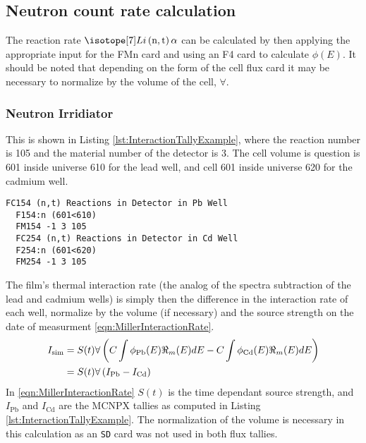 \documentclass[draftcls,onecolumn]{IEEEtran}
\begin{document}
\subsection{Neutron count rate calculation}
The reaction rate $\iso[7]{Li}\left(\text{n},\text{t}\right)\alpha$ can be calculated by then applying the appropriate input for the FMn card and using an F4 card to calculate $\phi(E)$.
It should be noted that depending on the form of the cell flux card it may be necessary to normalize by the volume of the cell, $\forall$.

\subsubsection{Neutron Irridiator}
\label{sec:NeutronIrridiatorInteractionRate}
This is shown in Listing \ref{lst:InteractionTallyExample}, where the reaction number is 105 and the material number of the detector is 3.
The cell volume is question is 601 inside universe 610 for the lead well, and cell 601 inside universe 620 for the cadmium well.
\begin{lstlisting}[caption={[Lead and Cadmium Well ${}^{6}\text{Li}\left(\text{n},\text{t}\right)\alpha$ Reaction Rate]Lead and Cadmium Well ${}^{6}\text{Li}\left(\text{n},\text{t}\right)\alpha$ Reaction Rates. The lead well is 154, and the cadmium well is 254},label={lst:InteractionTallyExample}]
  FC154 (n,t) Reactions in Detector in Pb Well
  F154:n (601<610)
  FM154 -1 3 105
  FC254 (n,t) Reactions in Detector in Cd Well
  F254:n (601<620)
  FM254 -1 3 105
\end{lstlisting}
The film's thermal interaction rate (the analog of the spectra subtraction of the lead and cadmium wells) is simply then the difference in the interaction rate of each well, normalize by the volume (if necessary) and the source strength on the date of measurment \eqref{eqn:MillerInteractionRate}.
\begin{align}
  I_{\text{sim}} &= S(t) \forall \left( C\int\phi_{\text{Pb}}(E)\Re_m(E)dE - C\int\phi_{\text{Cd}}(E)\Re_m(E)dE \right ) \notag \\
   &= S(t) \forall \left( I_{\text{Pb}} - I_{\text{Cd}}\right)
\end{align}
In \eqref{eqn:MillerInteractionRate} $S(t)$ is the time dependant source strength, and $I_{\text{Pb}}$ and $I_{\text{Cd}}$ are the MCNPX tallies as computed in Listing \ref{lst:InteractionTallyExample}.
The normalization of the volume is necessary in this calculation as an \verb+SD+ card was not used in both flux tallies.
\end{document}
